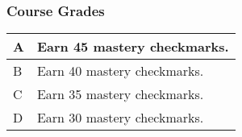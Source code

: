 \documentclass[aspectration=1610]{beamer}
\begin{document}
\begin{frame}\frametitle{Course Grades}

\begin{center}
\begin{tabular}{ll} \hline
A & Earn 45 mastery checkmarks.\\ \hline
B & Earn 40 mastery checkmarks. \\ \hline
C & Earn 35 mastery checkmarks.\\ \hline
D & Earn 30 mastery checkmarks. \\ \hline
\end{tabular}
\end{center}

\end{frame}
\end{document}

